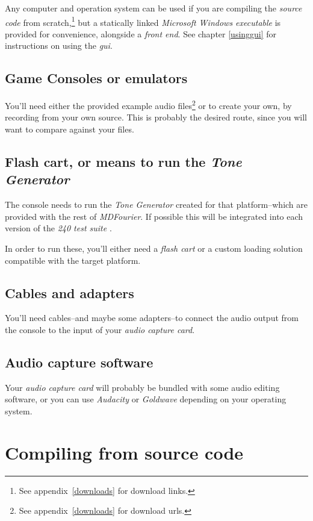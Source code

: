 \documentclass[10pt,a4paper]{report}
\newcommand{\ac}[1]{\textit{\mbox{\acrshort{#1}}}}
\begin{document}
\begin{appendices}
Any computer and operation system can be used if you are compiling the \textit{source code} from scratch,\footnote{See appendix~\ref{downloads} for download links.} but a statically linked \textit{Microsoft Windows executable} is provided for convenience, alongside a \textit{front end}. See chapter \ref{usinggui} for instructions on using the \ac{gui}.

\section{Game Consoles or emulators}

You'll need either the provided example audio files\footnote{See appendix~\ref{downloads} for download urls.} or to create your own, by recording from your own source. This is probably the desired route, since you will want to compare against your files.

\section{Flash cart, or means to run the \textit{Tone Generator}}

The console needs to run the \textit{Tone Generator} created for that platform--which are provided with the rest of \textit{MDFourier}. If possible this will be integrated into each version of the \textit{240 test suite} \cite{240pSuite}.

In order to run these, you'll either need a \textit{flash cart} or a custom loading solution compatible with the target platform.

\section{Cables and adapters}

You'll need cables--and maybe some adapters--to connect the audio output from the console to the input of your \textit{audio capture card}.

\section{Audio capture software}

Your \textit{audio capture card} will probably be bundled with some audio editing software, or you can use \textit{Audacity} \cite{audacity} or \textit{Goldwave} \cite{goldwave} depending on your operating system.

\chapter{Compiling from source code}


\end{appendices}
\end{document}
